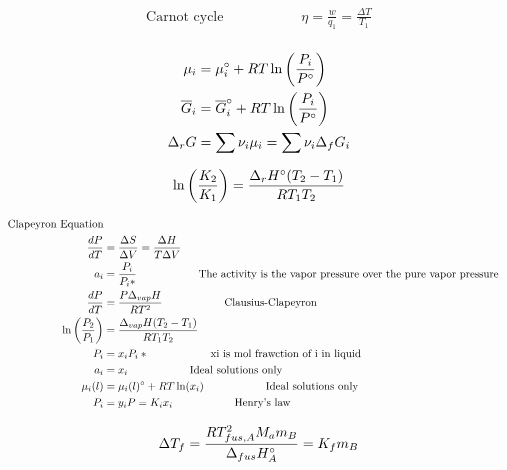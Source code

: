 \documentclass[10pt]{article} %
\begin{document}
\begin{align*}
  \mbox{Carnot cycle}&\hspace{2cm}\eta = \frac{w}{q_1} = \frac{\Delta T}{T_1}\\
\end{align*}

\begin{align*}
  \mu_i &= \mu_i\degree + RT\ln\left(\frac{P_i}{P\degree}\right)\\
  \overline{G}_i &= \overline{G}_i\degree + RT\ln\left(\frac{P_i}{P\degree}\right)\\
  \Delta_r G &= \sum \nu_i\mu_i = \sum \nu_i \Delta_f G_i\\
\end{align*}

\begin{align*}
  \ln\left(\frac{K_2}{K_1}\right) &= \frac{\Delta_r H\degree(T_2-T_1)}{RT_1T_2}\\
\end{align*}

\begin{align*}
  \mbox{Clapeyron Equation}\\
  \frac{dP}{dT} &= \frac{\Delta S}{\Delta V} = \frac{\Delta H}{T\Delta V}\\
  a_i &= \frac{P_i}{P_i*}\hspace{2cm}\mbox{The activity is the vapor pressure over the pure vapor pressure}\\
  \frac{dP}{dT} &= \frac{P\Delta_{vap}H}{RT^2}\hspace{2cm}\mbox{Clausius-Clapeyron}\\
  \ln\left(\frac{P_2}{P_1}\right) &= \frac{\Delta_{vap}H(T_2-T_1)}{RT_1T_2}\\
  P_i &= x_iP_i*\hspace{2cm}\mbox{xi is mol frawction of i in liquid}\\
  a_i &= x_i\hspace{2cm}\mbox{Ideal solutions only}\\
  \mu_i(l) &= \mu_i(l)\degree + RT\ln(x_i)\hspace{2cm}\mbox{Ideal solutions only}\\
  P_i &= y_iP = K_ix_i\hspace{2cm}\mbox{Henry's law}\\
\end{align*}

\begin{align*}
  \Delta T_f &= \frac{RT^2_{fus,A}M_am_B}{\Delta_{fus}H_A\degree} = K_fm_B\\
\end{align*}
\end{document}
